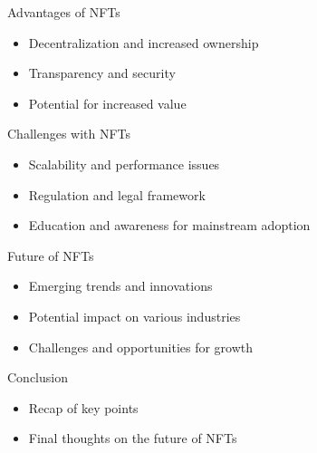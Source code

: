 \documentclass{beamer}
\begin{document}
\begin{frame}
{\centerline{Advantages of NFTs}}

\begin{itemize}
\item Decentralization and increased ownership
\item Transparency and security
\item Potential for increased value
\end{itemize}

\end{frame}

\begin{frame}
{\centerline{Challenges with NFTs}}

\begin{itemize}
\item Scalability and performance issues
\item Regulation and legal framework
\item Education and awareness for mainstream adoption
\end{itemize}

\end{frame}

\begin{frame}
{\centerline{Future of NFTs}}

\begin{itemize}
\item Emerging trends and innovations
\item Potential impact on various industries
\item Challenges and opportunities for growth
\end{itemize}

\end{frame}

\begin{frame}
{\centerline{Conclusion}}

\begin{itemize}
\item Recap of key points
\item Final thoughts on the future of NFTs
\end{itemize}

\end{frame}
\end{document}
